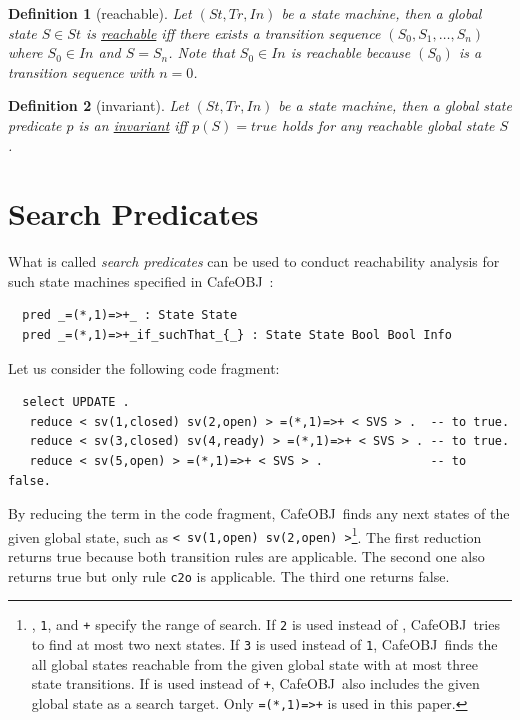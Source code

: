 \documentclass[12pt]{report}
\newtheorem{definition}{Definition}
\newcommand{\stt}[1]{{\small{\tt {#1}}}}
\newcommand{\ul}{\underline}
\newcommand{\cafeobj}{{\sf CafeOBJ}~}
\begin{document}
\begin{definition}[reachable]
  Let $(\mathit{St},\mathit{Tr},In)$ be a state machine, then a global state $S\in \mathit{St}$
  is \ul{reachable} iff there exists a transition sequence
  $(\mathit{S_0},\mathit{S_1},\dots,\mathit{S_n})$ where $\mathit{S_0}\in In$ and $S=\mathit{S_n}$. Note that $\mathit{S_0}\in
  In$ is reachable because $(\mathit{S_0})$ is a transition sequence with $n=0$.
\end{definition}
\begin{definition}[invariant]
  Let $(\mathit{St},\mathit{Tr},In)$ be a state machine, then a global state predicate
  $p$ is an \ul{invariant} iff $p(S)=true$ holds for any reachable
  global state $S$.
\end{definition}

\section{Search Predicates}
\label{sec:searchpredicate}
What is called {\it search predicates} can be used to conduct
reachability analysis for such state machines specified in
\cafeobj:
\small
\begin{verbatim}
  pred _=(*,1)=>+_ : State State
  pred _=(*,1)=>+_if_suchThat_{_} : State State Bool Bool Info
\end{verbatim}
\normalsize

Let us consider the following code fragment:
\small
\begin{verbatim}
  select UPDATE .
   reduce < sv(1,closed) sv(2,open) > =(*,1)=>+ < SVS > .  -- to true.
   reduce < sv(3,closed) sv(4,ready) > =(*,1)=>+ < SVS > . -- to true.
   reduce < sv(5,open) > =(*,1)=>+ < SVS > .               -- to false.
\end{verbatim}
\normalsize
By reducing the term in the code fragment, \cafeobj finds any next
states of the given global state, such as
\stt{<~sv(1,open)~sv(2,open)~>}\footnote{{\tt *}, {\tt 1}, and {\tt +}
  specify the range of search. If {\tt 2} is used instead of {\tt *},
  \cafeobj tries to find at most two next states. If {\tt 3} is used
  instead of {\tt 1}, \cafeobj finds the all global states reachable from the
  given global state with at most three state transitions. If {\tt *} is used
  instead of {\tt +}, \cafeobj also includes the given global state as a
  search target.  Only \stt{=(*,1)=>+} is used in this paper.}.  The
first reduction returns true because both transition rules are
applicable.  The second one also returns true but only rule {\tt c2o}
is applicable. The third one returns false.
\end{document}
